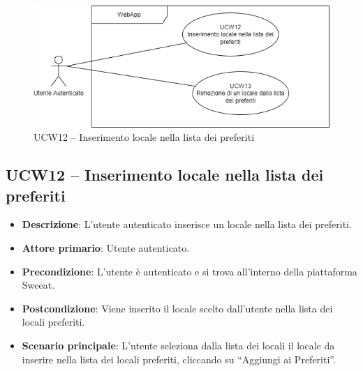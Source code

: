 \begin{figure}[!h]
\centering
    \includegraphics[scale=0.5]{UC_images/UCW12-13.png} 
    \caption{UCW12 – Inserimento locale nella lista dei preferiti}
\end{figure}

\subsection{UCW12 – Inserimento locale nella lista dei preferiti}
\begin{itemize}
    \item \textbf{Descrizione}: L'utente autenticato inserisce un locale nella lista dei preferiti.
    \item \textbf{Attore primario}: Utente autenticato.
    \item \textbf{Precondizione}: L'utente è autenticato e si trova all’interno della piattaforma Sweeat.
    \item \textbf{Postcondizione}: Viene inserito il locale scelto dall’utente nella lista dei locali preferiti.
    \item \textbf{Scenario principale}: L’utente seleziona dalla lista dei locali il locale da inserire nella lista dei locali preferiti, cliccando su “Aggiungi ai Preferiti”.
\end{itemize}

